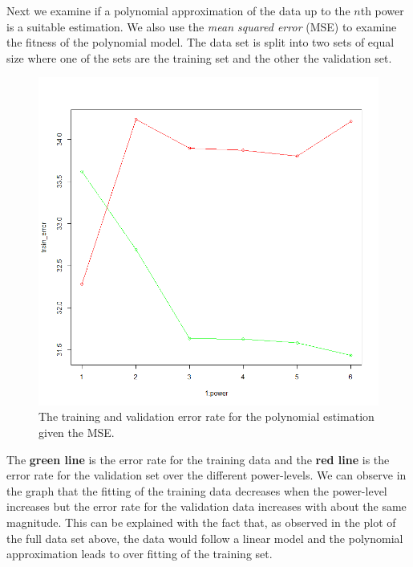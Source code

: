 \documentclass[a4paper,12pt]{article}
\begin{document}
Next we examine if a polynomial approximation of the data up to the \(n\)th power is a suitable estimation. We also use the \textit{mean squared error} (MSE) to examine the fitness of the polynomial model. The data set is split into two sets of equal size where one of the sets are the training set and the other the validation set. 

\begin{figure}[H]
\centering
\begin{minipage}[]{0.75\textwidth}
  \includegraphics[width=\textwidth]{figures/Lab2A2_test_train_err.png}  
  \caption{The training and validation error rate for the polynomial estimation given the MSE.}
 \end{minipage}
\end{figure}

The \textbf{green line} is the error rate for the training data and the \textbf{red line} is the error rate for the validation set over the different power-levels. We can observe in the graph that the fitting of the training data decreases when the power-level increases but the error rate for the validation data increases with about the same magnitude. This can be explained with the fact that, as observed in the plot of the full data set above, the data would follow a linear model and the polynomial approximation leads to over fitting of the training set.  
\end{document}
